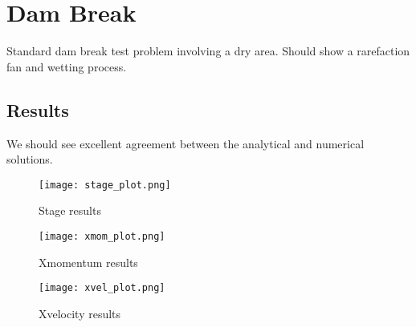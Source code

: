 
\section{Dam Break}

Standard dam break test problem involving a dry area. Should show a rarefaction fan and wetting process. 

\subsection{Results}


We should see excellent agreement between the analytical and numerical solutions.

\begin{figure}[h]
\begin{center}
\texttt{[image: stage\_plot.png]}
\end{center}
\caption{Stage results}
\end{figure}


\begin{figure}[h]
\begin{center}
\texttt{[image: xmom\_plot.png]}
\end{center}
\caption{Xmomentum results}
\end{figure}


\begin{figure}[h]
\begin{center}
\texttt{[image: xvel\_plot.png]}
\end{center}
\caption{Xvelocity results}
\end{figure}


\endinput
